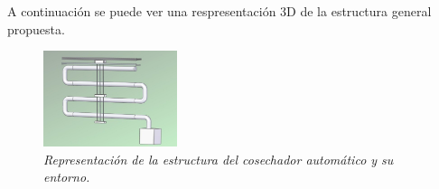 A continuación se puede ver una respresentación 3D de la estructura general propuesta.
\begin{figure}[H]
        \centering
        \includegraphics[width=0.35\textwidth]{img/ClaudioReal_simplificado.jpg}
        \caption{\textit{Representación de la estructura del cosechador automático y su entorno.}}
        \label{fig:ClaudioReal_simplificado}
\end{figure}
